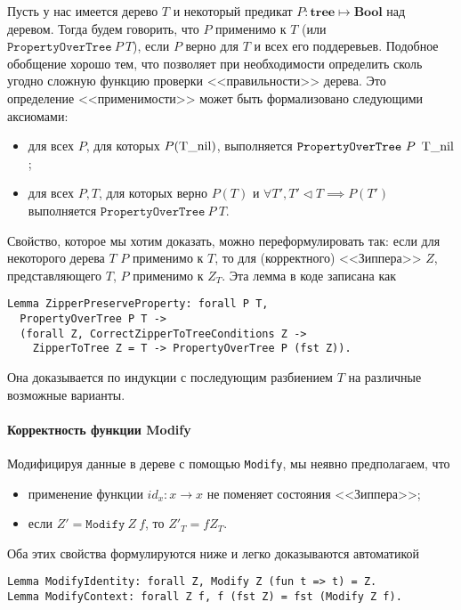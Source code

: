 Пусть у нас имеется дерево $T$ и некоторый предикат $P : \textbf{tree} \mapsto \textbf{Bool}$ над деревом. Тогда будем говорить, что $P$ применимо к $T$ (или $\texttt{PropertyOverTree}\ P\ T$), если $P$ верно для $T$ и всех его поддеревьев. Подобное обобщение хорошо тем, что позволяет при необходимости определить сколь угодно сложную функцию проверки <<правильности>> дерева. Это определение <<применимости>> может быть формализовано следующими аксиомами:

\begin{itemize}
\item для всех $P$, для которых $P(\operatorname{T\_nil})$, выполняется $\texttt{PropertyOverTree}\ P\ \btnil$;
\item для всех $P, T$, для которых верно $P(T)$ и $\forall T', T' \triangleleft T \implies P(T')$ выполняется $\texttt{PropertyOverTree}\ P\ T$.
\end{itemize}

Свойство, которое мы хотим доказать, можно переформулировать так: если для некоторого дерева $T$ $P$ применимо к $T$, то для (корректного) <<Зиппера>> $Z$, представляющего $T$, $P$ применимо к $Z_T$. Эта лемма в коде записана как
\begin{Verbatim}[fontsize=\small]
Lemma ZipperPreserveProperty: forall P T,
  PropertyOverTree P T ->
  (forall Z, CorrectZipperToTreeConditions Z ->
    ZipperToTree Z = T -> PropertyOverTree P (fst Z)).
\end{Verbatim}
Она доказывается по индукции с последующим разбиением $T$ на различные возможные варианты.

\paragraph{Корректность функции Modify}

Модифицируя данные в дереве с помощью \texttt{Modify}, мы неявно предполагаем, что
\begin{itemize}
\item применение функции $id_x : x \rightarrow x$ не поменяет состояния <<Зиппера>>;
\item если $Z' = \texttt{Modify}\ Z\ f$, то $Z'_T = f Z_T$.
\end{itemize}

Оба этих свойства формулируются ниже и легко доказываются автоматикой \tcoq
\begin{Verbatim}[fontsize=\small]
Lemma ModifyIdentity: forall Z, Modify Z (fun t => t) = Z.
Lemma ModifyContext: forall Z f, f (fst Z) = fst (Modify Z f).
\end{Verbatim}

